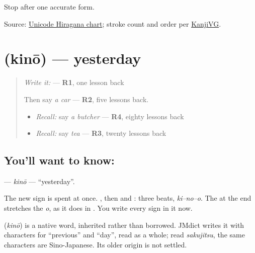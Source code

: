 \begin{tcolorbox}[breakable,colback=teal!4,colframe=teal!35!black,title={Before you move on}]
Stop after one accurate form.

Source: \href{https://www.unicode.org/charts/PDF/U3040.pdf}{Unicode Hiragana chart}; stroke count and order per \href{https://kanjivg.tagaini.net/kanjivg/kanji/0304d.html}{KanjiVG}.
\end{tcolorbox}
\section[\texorpdfstring{\ja{きのう} (kinō)}{きのう (kinō)}]{ (kinō) — yesterday}

\label{lesson:JA-C133-kinou}



\begin{quote}
\emph{Write it:} \textbf{} — \textbf{R1}, one lesson back

Then say \emph{a car} — \textbf{R2}, five lessons back.

\begin{itemize}
\raggedright
  \item \emph{Recall:} say \emph{a butcher} — \textbf{R4}, eighty lessons back
  \item \emph{Recall:} say \emph{tea} — \textbf{R3}, twenty lessons back
\end{itemize}
\end{quote}

\subsection*{You'll want to know: }
\textbf{} — \emph{kinō} — \textquotedblleft{}yesterday\textquotedblright{}.

The new sign is spent at once. \textbf{}, then \textbf{} and \textbf{}: three beats, \emph{ki–no–o}. The \textbf{} at the end stretches the \emph{o}, as it does in \textbf{}. You write every sign in it now.

\begin{cousinweb}
\textbf{} (\emph{kinō}) is a native word, inherited rather than borrowed. JMdict writes it with characters for \textquotedblleft{}previous\textquotedblright{} and \textquotedblleft{}day\textquotedblright{}, read as a whole; read \emph{sakujitsu}, the same characters are Sino-Japanese. Its older origin is not settled.
\end{cousinweb}

